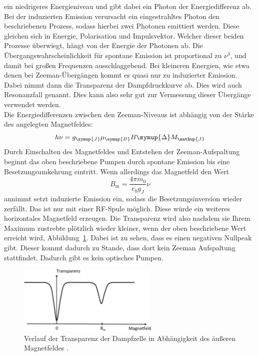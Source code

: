 \documentclass[
  bibliography=totoc,     %
  captions=tableheading,  %
  titlepage=firstiscover, %
]{scrartcl}
\begin{document}
ein niedrigeres Energieniveau und gibt dabei ein Photon der Energiedifferenz
ab. Bei der induzierten Emission verursacht ein eingestrahltes Photon
den beschriebenen Prozess, sodass hierbei zwei Photonen emittiert werden. Diese
gleichen sich in Energie, Polarisation und Impulsvektor. Welcher dieser beiden
Prozesse überwiegt, hängt von der Energie der Photonen ab. Die
Übergangswahrscheinlichkeit für spontane Emission ist proportional zu $\nu^3$,
und damit bei großen Frequenzen ausschlaggebend. Bei kleineren Energien, wie
etwa denen bei Zeeman-Übergängen kommt es quasi nur zu induzierter Emission.
Dabei nimmt dann die Transparenz der Dampfdruckkurve ab. Dies wird auch Resonanzfall
genannt.
Dies kann also sehr gut zur Vermessung dieser Übergänge verwendet werden. \\
Die Energiedifferenzen zwischen den Zeeman-Niveaus ist abhängig von der Stärke
des angelegten Magnetfeldes:
%
\begin{equation}
  h\nu=g_{\symup{J}}\mu_{\symup{B}}B\symup{\Delta}M_{\mathup{J}}
  \label{eq:übergangsenergie}
\end{equation}
%
Durch Einschalten des Magnetfeldes und Entstehen der Zeeman-Aufspaltung beginnt
das oben beschriebene Pumpen durch spontane Emission bis eine
Besetzungsumkehrung eintritt. Wenn allerdings das Magnetfeld den Wert
%
\begin{equation}
  B_{\mathup{m}}=\frac{4\pi m_0}{e_0g_J}\nu
\end{equation}
%
annimmt setzt induzierte Emission ein, sodass die Besetzungsinversion wieder
zerfällt. Das ist nur mit einer RF-Spule möglich. Diese würde ein weiteres horizontales
Magnetfeld erzeugen. Die Transparenz wird also nachdem sie Ihrem Maximum zustrebte plötzlich
wieder kleiner, wenn der oben beschriebene Wert erreicht wird, Abbildung~\ref{fig:transparenz_b}.
Dabei ist zu sehen, dass es einen negativen Nullpeak gibt. Dieser kommt dadurch
zu Stande, dass dort kein Zeeman Aufspaltung stattfindet. Dadurch gibt es kein
optisches Pumpen.
\begin{figure}[htb]
  \centering
  \includegraphics[width=0.6\textwidth]{transparenzkurve.pdf}
  \caption{Verlauf der Transparenz der Dampfzelle in Abhängigkeit des äußeren Magnetfeldes \cite{anleitung}.}
  \label{fig:transparenz_b}
\end{figure}
%
\end{document}
